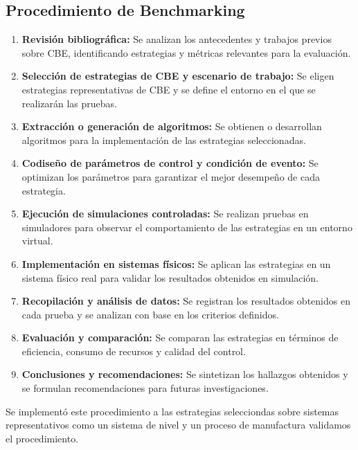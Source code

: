 \documentclass[conference]{IEEEtran}
\begin{document}
\subsection{Procedimiento de Benchmarking}
\begin{enumerate}
    \item \textbf{Revisi\'on bibliogr\'afica:} Se analizan los antecedentes y trabajos previos sobre CBE, identificando estrategias y m\'etricas relevantes para la evaluaci\'on.
    \item \textbf{Selecci\'on de estrategias de CBE y escenario de trabajo:} Se eligen estrategias representativas de CBE y se define el entorno en el que se realizar\'an las pruebas.
    \item \textbf{Extracci\'on o generaci\'on de algoritmos:} Se obtienen o desarrollan algoritmos para la implementaci\'on de las estrategias seleccionadas.
    \item \textbf{Codise\~no de par\'ametros de control y condici\'on de evento:} Se optimizan los par\'ametros para garantizar el mejor desempe\~no de cada estrategia.
    \item \textbf{Ejecuci\'on de simulaciones controladas:} Se realizan pruebas en simuladores para observar el comportamiento de las estrategias en un entorno virtual.
    \item \textbf{Implementaci\'on en sistemas f\'isicos:} Se aplican las estrategias en un sistema f\'isico real para validar los resultados obtenidos en simulaci\'on.
    \item \textbf{Recopilaci\'on y an\'alisis de datos:} Se registran los resultados obtenidos en cada prueba y se analizan con base en los criterios definidos.
    \item \textbf{Evaluaci\'on y comparaci\'on:} Se comparan las estrategias en t\'erminos de eficiencia, consumo de recursos y calidad del control.
    \item \textbf{Conclusiones y recomendaciones:} Se sintetizan los hallazgos obtenidos y se formulan recomendaciones para futuras investigaciones.
\end{enumerate}
Se implement\'o este procedimiento a las estrategias selecciondas sobre sistemas representativos como un sistema de nivel y un proceso de manufactura  validamos el procedimiento.
\end{document}
